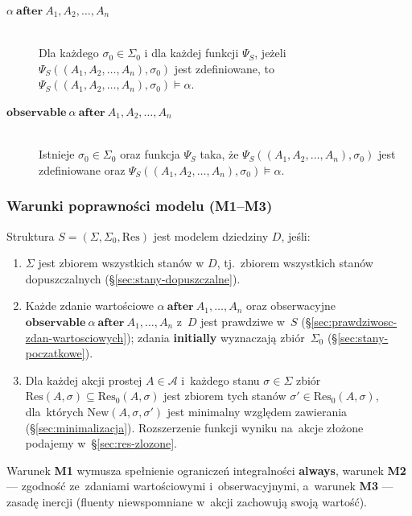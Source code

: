 \documentclass[11pt,a4paper]{article}
\theoremstyle{definition}
\begin{document}
\begin{description}
    \item[$\alpha \ \textbf{after} \ A_1, A_2, \dots, A_n$] \hfill \\
        Dla każdego $\sigma_0 \in \Sigma_0$ i dla każdej funkcji $\Psi_S$, jeżeli $\Psi_S((A_1, A_2, \dots, A_n), \sigma_0)$ jest zdefiniowane, to $\Psi_S((A_1, A_2, \dots, A_n), \sigma_0) \models \alpha$.
    \item[$\textbf{observable} \  \alpha \ \textbf{after} \ A_1, A_2, \dots, A_n$] \hfill \\
        Istnieje $\sigma_0 \in \Sigma_0$ oraz funkcja $\Psi_S$ taka, że $\Psi_S((A_1, A_2, \dots, A_n), \sigma_0)$ jest zdefiniowane oraz $\Psi_S((A_1, A_2, \dots, A_n), \sigma_0) \models \alpha$.
\end{description}

\subsubsection{Warunki poprawności modelu (M1--M3)}
\label{sec:model-dziedziny}

Struktura $S = (\Sigma, \Sigma_0, \mathrm{Res})$ jest modelem dziedziny $D$, jeśli:

\begin{enumerate}[label=\textbf{(M\arabic*)}]
    \item $\Sigma$ jest zbiorem wszystkich stanów w $D$, tj.\ zbiorem wszystkich stanów dopuszczalnych (\S\ref{sec:stany-dopuszczalne}).
    \item Każde zdanie wartościowe $\alpha\ \textbf{after}\ A_1,\dots,A_n$ oraz obserwacyjne $\textbf{observable}\ \alpha\ \textbf{after}\ A_1,\dots,A_n$ z~$D$ jest prawdziwe w~$S$ (\S\ref{sec:prawdziwosc-zdan-wartosciowych}); zdania \textbf{initially} wyznaczają zbiór~$\Sigma_0$ (\S\ref{sec:stany-poczatkowe}).
    \item Dla każdej akcji prostej $A \in \mathcal{A}$ i~każdego stanu $\sigma \in \Sigma$ zbiór $\mathrm{Res}(A, \sigma) \subseteq \mathrm{Res}_0(A, \sigma)$ jest zbiorem tych stanów $\sigma' \in \mathrm{Res}_0(A, \sigma)$, dla~których $\mathrm{New}(A, \sigma, \sigma')$ jest minimalny względem zawierania (\S\ref{sec:minimalizacja}). Rozszerzenie funkcji wyniku na~akcje złożone podajemy w~\S\ref{sec:res-zlozone}.
\end{enumerate}

Warunek \textbf{M1} wymusza spełnienie ograniczeń integralności \textbf{always}, warunek \textbf{M2} --- zgodność ze~zdaniami wartościowymi i~obserwacyjnymi, a~warunek \textbf{M3} --- zasadę inercji (fluenty niewspomniane w~akcji zachowują swoją wartość).
\end{document}
